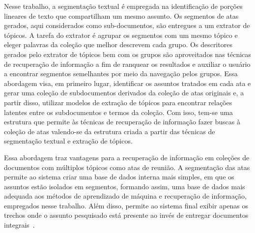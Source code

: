 Nesse trabalho, a segmentação textual é empregada na identificação de porções lineares de texto que compartilham um mesmo assunto. Os segmentos de atas gerados, aqui considerados como sub-documentos, são entregues a um extrator de tópicos. A tarefa do extrator é agrupar os segmentos com um mesmo tópico e eleger palavras da coleção que melhor descrevem cada grupo. Os descritores gerados pelo extrator de tópicos bem com os grupos são aproveitados nas técnicas de recuperação de informação a fim de ranquear os resultados e auxiliar o usuário a encontrar segmentos semelhantes por meio da navegação pelos grupos. Essa abordagem visa, em primeiro lugar, identificar os assuntos tratados em cada ata e gerar uma coleção de subdocumentos derivados da coleção de atas originais e, a partir disso, utilizar modelos de extração de tópicos para encontrar relações latentes entre os subdocumentos e termos da coleção. Com isso, tem-se uma estrutura que permite às técnicas de recuperação de informação fazer buscas à coleção de atas valendo-se da estrutura criada a partir das técnicas de segmentação textual e extração de tópicos. 





%
%
Essa abordagem traz vantagens para a recuperação de informação em coleções de documentos com múltiplos tópicos como atas de reunião.
A segmentação das atas permite ao sistema criar uma base de dados interna mais simples, em que os assuntos estão isolados em segmentos, formando assim, uma base de dados mais adequada aos métodos de aprendizado de máquina e recuperação de informação, empregados nesse trabalho. Além disso, permite ao sistema final exibir apenas os trechos onde o assunto pesquisado está presente ao invés de entregar documentos integrais~\cite{Tagarelli2013, Jeong:2010, Prince2007, Huang2003}. 
%


